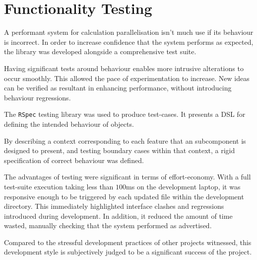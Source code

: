 \section{Functionality Testing}
A performant system for calculation parallelisation isn't much use if its behaviour is incorrect. In order to increase confidence that the system performs as expected, the library was developed alongside a comprehensive test suite.

Having significant tests around behaviour enables more intrusive alterations to occur smoothly. This allowed the pace of experimentation to increase. New ideas can be verified as resultant in enhancing performance, without introducing behaviour regressions.

The \verb|RSpec|\cite{rspec} testing library was used to produce test-cases. It presents a \ac{DSL} for defining the intended behaviour of objects.

By describing a context corresponding to each feature that an subcomponent is designed to present, and testing boundary cases within that context, a rigid specification of correct behaviour was defined.

The advantages of testing were significant in terms of effort-economy. With a full test-suite execution taking less than $100$ms on the development laptop, it was responsive enough to be triggered by each updated file within the development directory. This immediately highlighted interface clashes and regressions introduced during development. In addition, it reduced the amount of time wasted, manually checking that the system performed as advertised.

Compared to the stressful development practices of other projects witnessed, this development style is subjectively judged to be a significant success of the project.
